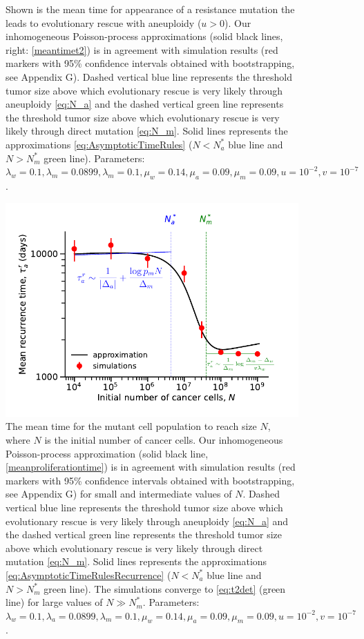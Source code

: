 \documentclass[12pt]{extarticle}
\begin{document}
\begin{appendices}
\begin{figure}
\caption{Shown is the mean time for appearance of a resistance mutation the leads to evolutionary rescue with aneuploidy ($u>0$). Our inhomogeneous Poisson-process approximations (solid black lines, right: \cref{meantimet2}) is in agreement with simulation results (red markers with 95\% confidence intervals obtained with bootstrapping, see Appendix G). Dashed vertical blue line represents the threshold tumor size above which evolutionary rescue is very likely through aneuploidy \cref{eq:N_a} and the dashed vertical green line represents the threshold tumor size above which evolutionary rescue is very likely through direct mutation \cref{eq:N_m}. Solid lines represents the approximations \cref{eq:AsymptoticTimeRules} ($N<N_a^*$ blue line and $N>N_m^*$ green line). 
Parameters: $\lambda_w=0.1,\lambda_m=0.0899,\lambda_m=0.1,\mu_w=0.14,\mu_a=0.09,\mu_m=0.09, u=10^{-2}, v=10^{-7}$.}
\label{EvolutionaryRescueTimeComplete}
\end{figure}
\begin{figure}
\vspace*{1\baselineskip}
\includegraphics[width=1\textwidth]{Figures/ProliferationTimeLarge.pdf}
\caption{The mean time for the mutant cell population to reach size $N$, where $N$ is the initial number of cancer cells.
Our inhomogeneous Poisson-process approximation (solid black line, \cref{meanproliferationtime}) is in agreement with simulation results (red markers with 95\% confidence intervals obtained with bootstrapping, see Appendix G) for small and intermediate values of $N$. Dashed vertical blue line represents the threshold tumor size above which evolutionary rescue is very likely through aneuploidy \cref{eq:N_a} and the dashed vertical green line represents the threshold tumor size above which evolutionary rescue is very likely through direct mutation \cref{eq:N_m}. Solid lines represents the approximations \cref{eq:AsymptoticTimeRulesRecurrence} ($N<N_a^*$ blue line and $N>N_m^*$ green line). The simulations converge to \cref{eq:t2det} (green line) for large values of $N\gg N_m^*$.  Parameters: $\lambda_w=0.1,\lambda_a=0.0899,\lambda_m=0.1,\mu_w=0.14,\mu_a=0.09,\mu_m=0.09, u=10^{-2}, v=10^{-7}$.}

\end{figure}
\end{appendices}
\end{document}
